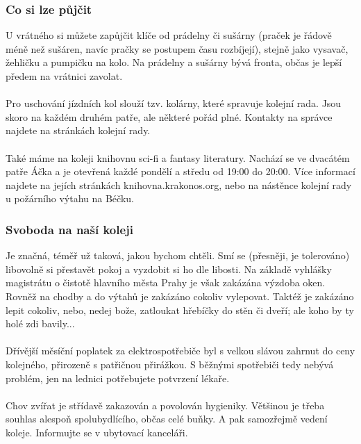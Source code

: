 \subsubsection{Co si lze půjčit}
U vrátného si můžete zapůjčit klíče od prádelny či sušárny (praček je řádově
méně než sušáren, navíc pračky se postupem času rozbíjejí), stejně jako vysavač,
žehličku a pumpičku na kolo. Na prádelny a sušárny bývá fronta, občas je lepší
předem na vrátnici zavolat.
\\\\
Pro uschování jízdních kol slouží tzv. kolárny, které spravuje kolejní rada.
Jsou skoro na každém druhém patře, ale některé pořád plné. Kontakty na správce
najdete na stránkách kolejní rady.
\\\\
Také máme na koleji knihovnu sci-fi a fantasy literatury. Nachází se ve dvacátém
patře Áčka a je otevřená každé pondělí a středu od 19:00 do 20:00. Více
informací najdete na jejích stránkách knihovna.krakonos.org, nebo na nástěnce
kolejní rady u požárního výtahu na Béčku.


\subsubsection{Svoboda na naší koleji}
Je značná, téměř už taková, jakou bychom chtěli. Smí se (přesněji, je
tolerováno) libovolně si přestavět pokoj a vyzdobit si ho dle libosti. Na
základě vyhlášky magistrátu o čistotě hlavního města Prahy je však zakázána
výzdoba oken. Rovněž na chodby a do výtahů je zakázáno cokoliv vylepovat. Taktéž
je zakázáno lepit cokoliv, nebo, nedej bože, zatloukat hřebíčky do stěn či
dveří; ale koho by ty holé zdi bavily...
\\\\
Dřívější měsíční poplatek za elektrospotřebiče byl s velkou slávou zahrnut do
ceny kolejného, přirozeně s patřičnou přirážkou. S běžnými spotřebiči tedy
nebývá problém, jen na lednici potřebujete potvrzení lékaře.
\\\\
Chov zvířat je střídavě zakazován a povolován hygieniky. Většinou je třeba
souhlas alespoň spolubydlícího, občas celé buňky. A pak samozřejmě vedení
koleje. Informujte se v ubytovací kanceláři.


